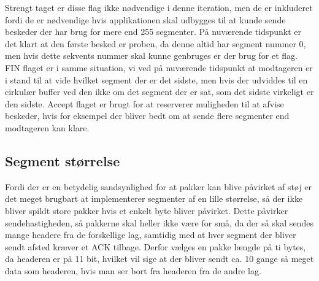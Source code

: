 Strengt taget er disse flag ikke nødvendige i denne iteration, men de er inkluderet fordi de er nødvendige hvis applikationen skal udbygges til at kunde sende beskeder der har brug for mere end 255 segmenter. På nuværende tidspunkt er det klart at den første besked er proben, da denne altid har segment nummer 0, men hvis dette sekvents nummer skal kunne genbruges er der brug for et flag. FIN flaget er i samme situation, vi ved på nuværende tidspunkt at modtageren er i stand til at vide hvilket segment der er det sidste, men hvis der udviddes til en cirkulær buffer ved den ikke om det segment der er sat, som det sidste virkeligt er den sidste. Accept flaget er brugt for at reserverer muligheden til at afvise beskeder, hvis for eksempel der bliver bedt om at sende flere segmenter end modtageren kan klare.
\\
\subsection{Segment størrelse}

Fordi der er en betydelig sandsynlighed for at pakker kan blive påvirket af støj er det meget brugbart at implementerer segmenter af en lille størrelse, så der ikke bliver spildt store pakker hvis et enkelt byte bliver påvirket. Dette påvirker sendehastigheden, så pakkerne skal heller ikke være for små, da der så skal sendes mange headere fra de forskellige lag, samtidig med at hver segment der bliver sendt afsted kræver et ACK tilbage. Derfor vælges en pakke længde på ti bytes, da headeren er på 11 bit, hvilket vil sige at der bliver sendt ca. 10 gange så meget data som headeren, hvis man ser bort fra headeren fra de andre lag.
\\
